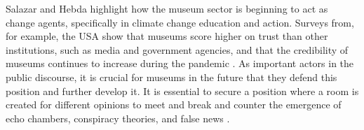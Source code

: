 Salazar and Hebda highlight how the museum sector is beginning to act as change agents, specifically in climate change education and action. Surveys from, for example, the USA show that museums score higher on trust than other institutions, such as media and government agencies, and that the credibility of museums continues to increase during the pandemic \autocite{impact_2020}. As important actors in the public discourse, it is crucial for museums in the future that they defend this position and further develop it. It is essential to secure a position where a room is created for different opinions to meet and break and counter the emergence of echo chambers, conspiracy theories, and false news \autocite[p. 41]{melding23}.